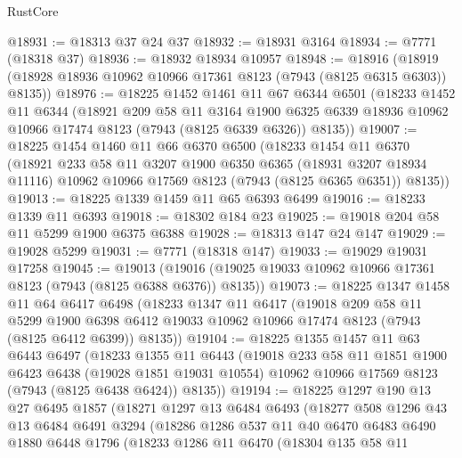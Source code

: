 \begin{lexlean}{RustCore}
\begin{coremodule}
@18931 := @18313 @37 @24 @37
@18932 := @18931 @3164
@18934 := @7771 (@18318 @37)
@18936 := @18932 @18934 @10957
@18948 := @18916
    (@18919 (@18928 @18936 @10962 @10966 @17361 @8123 (@7943 (@8125 @6315 @6303)) @8135))
@18976 := @18225
    @1452
    @1461
    @11
    @67
    @6344
    @6501
    (@18233
      @1452
      @11
      @6344
      (@18921
        @209
        @58
        @11
        @3164
        @1900
        @6325
        @6339
        @18936
        @10962
        @10966
        @17474
        @8123
        (@7943 (@8125 @6339 @6326))
        @8135))
@19007 := @18225
    @1454
    @1460
    @11
    @66
    @6370
    @6500
    (@18233
      @1454
      @11
      @6370
      (@18921
        @233
        @58
        @11
        @3207
        @1900
        @6350
        @6365
        (@18931 @3207 @18934 @11116)
        @10962
        @10966
        @17569
        @8123
        (@7943 (@8125 @6365 @6351))
        @8135))
@19013 := @18225 @1339 @1459 @11 @65 @6393 @6499
@19016 := @18233 @1339 @11 @6393
@19018 := @18302 @184 @23
@19025 := @19018 @204 @58 @11 @5299 @1900 @6375 @6388
@19028 := @18313 @147 @24 @147
@19029 := @19028 @5299
@19031 := @7771 (@18318 @147)
@19033 := @19029 @19031 @17258
@19045 := @19013
    (@19016 (@19025 @19033 @10962 @10966 @17361 @8123 (@7943 (@8125 @6388 @6376)) @8135))
@19073 := @18225
    @1347
    @1458
    @11
    @64
    @6417
    @6498
    (@18233
      @1347
      @11
      @6417
      (@19018
        @209
        @58
        @11
        @5299
        @1900
        @6398
        @6412
        @19033
        @10962
        @10966
        @17474
        @8123
        (@7943 (@8125 @6412 @6399))
        @8135))
@19104 := @18225
    @1355
    @1457
    @11
    @63
    @6443
    @6497
    (@18233
      @1355
      @11
      @6443
      (@19018
        @233
        @58
        @11
        @1851
        @1900
        @6423
        @6438
        (@19028 @1851 @19031 @10554)
        @10962
        @10966
        @17569
        @8123
        (@7943 (@8125 @6438 @6424))
        @8135))
@19194 := @18225
    @1297
    @190
    @13
    @27
    @6495
    @1857
    (@18271
      @1297
      @13
      @6484
      @6493
      (@18277
        @508
        @1296
        @43
        @13
        @6484
        @6491
        @3294
        (@18286
          @1286
          @537
          @11
          @40
          @6470
          @6483
          @6490
          @1880
          @6448
          @1796
          (@18233
            @1286
            @11
            @6470
            (@18304
              @135
              @58
              @11

\end{coremodule}
\end{lexlean}
